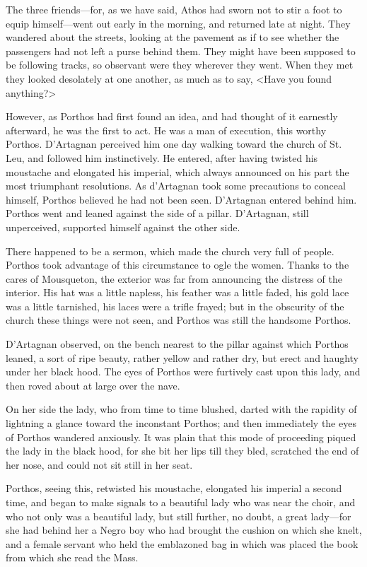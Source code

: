 The three friends---for, as we have said, Athos had sworn not to stir a foot to equip himself---went out early in the morning, and returned late at night. They wandered about the streets, looking at the pavement as if to see whether the passengers had not left a purse behind them. They might have been supposed to be following tracks, so observant were they wherever they went. When they met they looked desolately at one another, as much as to say, <Have you found anything?> 

However, as Porthos had first found an idea, and had thought of it earnestly afterward, he was the first to act. He was a man of execution, this worthy Porthos. D'Artagnan perceived him one day walking toward the church of St. Leu, and followed him instinctively. He entered, after having twisted his moustache and elongated his imperial, which always announced on his part the most triumphant resolutions. As d'Artagnan took some precautions to conceal himself, Porthos believed he had not been seen. D'Artagnan entered behind him. Porthos went and leaned against the side of a pillar. D'Artagnan, still unperceived, supported himself against the other side. 

There happened to be a sermon, which made the church very full of people. Porthos took advantage of this circumstance to ogle the women. Thanks to the cares of Mousqueton, the exterior was far from announcing the distress of the interior. His hat was a little napless, his feather was a little faded, his gold lace was a little tarnished, his laces were a trifle frayed; but in the obscurity of the church these things were not seen, and Porthos was still the handsome Porthos. 

D'Artagnan observed, on the bench nearest to the pillar against which Porthos leaned, a sort of ripe beauty, rather yellow and rather dry, but erect and haughty under her black hood. The eyes of Porthos were furtively cast upon this lady, and then roved about at large over the nave. 

On her side the lady, who from time to time blushed, darted with the rapidity of lightning a glance toward the inconstant Porthos; and then immediately the eyes of Porthos wandered anxiously. It was plain that this mode of proceeding piqued the lady in the black hood, for she bit her lips till they bled, scratched the end of her nose, and could not sit still in her seat. 

Porthos, seeing this, retwisted his moustache, elongated his imperial a second time, and began to make signals to a beautiful lady who was near the choir, and who not only was a beautiful lady, but still further, no doubt, a great lady---for she had behind her a Negro boy who had brought the cushion on which she knelt, and a female servant who held the emblazoned bag in which was placed the book from which she read the Mass. 

